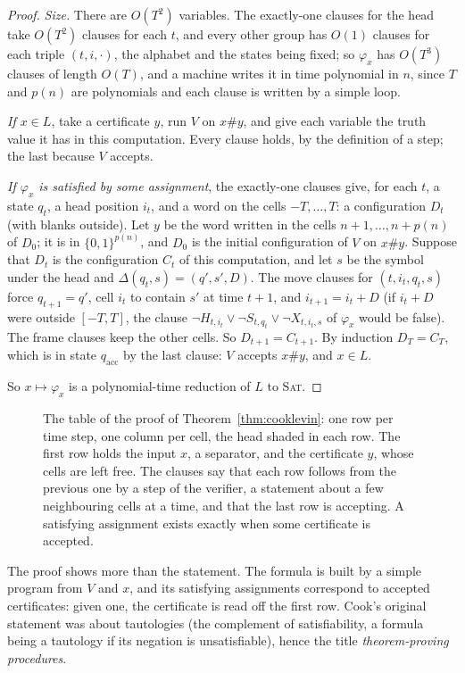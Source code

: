 \begin{proof}
\emph{Size.} There are $O(T^2)$ variables. The exactly-one clauses for the head take $O(T^2)$ clauses for each $t$, and every other group has $O(1)$ clauses for each triple $(t,i,\cdot)$, the alphabet and the states being fixed; so $\varphi_x$ has $O(T^3)$ clauses of length $O(T)$, and a machine writes it in time polynomial in $n$, since $T$ and $p(n)$ are polynomials and each clause is written by a simple loop.

\emph{If $x\in L$}, take a certificate $y$, run $V$ on $x\#y$, and give each variable the truth value it has in this computation. Every clause holds, by the definition of a step; the last because $V$ accepts.

\emph{If $\varphi_x$ is satisfied by some assignment}, the exactly-one clauses give, for each $t$, a state $q_t$, a head position $i_t$, and a word on the cells $-T,\dots,T$: a configuration $D_t$ (with blanks outside). Let $y$ be the word written in the cells $n+1,\dots,n+p(n)$ of $D_0$; it is in $\{0,1\}^{p(n)}$, and $D_0$ is the initial configuration of $V$ on $x\#y$. Suppose that $D_t$ is the configuration $C_t$ of this computation, and let $s$ be the symbol under the head and $\Delta(q_t,s)=(q',s',D)$. The move clauses for $(t,i_t,q_t,s)$ force $q_{t+1}=q'$, cell $i_t$ to contain $s'$ at time $t+1$, and $i_{t+1}=i_t+D$ (if $i_t+D$ were outside $[-T,T]$, the clause $\neg H_{t,i_t}\lor\neg S_{t,q_t}\lor\neg X_{t,i_t,s}$ of $\varphi_x$ would be false). The frame clauses keep the other cells. So $D_{t+1}=C_{t+1}$. By induction $D_T=C_T$, which is in state $q_{\mathrm{acc}}$ by the last clause: $V$ accepts $x\#y$, and $x\in L$.

So $x\mapsto\varphi_x$ is a polynomial-time reduction of $L$ to \textup{\textsc{Sat}}.
\end{proof}

\begin{figure}[ht]
\centering
{}
\caption{The table of the proof of Theorem~\ref{thm:cooklevin}: one row per time step, one column per cell, the head shaded in each row. The first row holds the input $x$, a separator, and the certificate $y$, whose cells are left free. The clauses say that each row follows from the previous one by a step of the verifier, a statement about a few neighbouring cells at a time, and that the last row is accepting. A satisfying assignment exists exactly when some certificate is accepted.}
\label{fig:tableau}
\end{figure}

The proof shows more than the statement. The formula is built by a simple program from $V$ and $x$, and its satisfying assignments correspond to accepted certificates: given one, the certificate is read off the first row. Cook's original statement was about tautologies (the complement of satisfiability, a formula being a tautology if its negation is unsatisfiable), hence the title \emph{theorem-proving procedures}.

